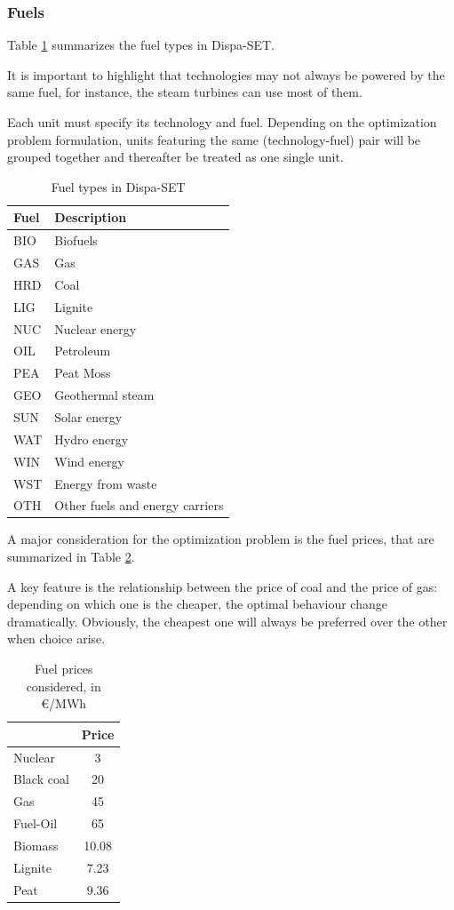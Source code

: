 \subsubsection{Fuels}

Table \ref{table:fuels-eu} summarizes the fuel types in Dispa-SET.

It is important to highlight that technologies may not always be powered by the same fuel, for instance, the steam turbines can use most of them.

Each unit must specify its technology and fuel. Depending on the optimization problem formulation, units featuring the same (technology-fuel) pair will be grouped together and thereafter be treated as one single unit.

\begin{table}[h]
    \centering
	\begin{tabular}{|l l|}
		\hline
		Fuel & Description\\
		\hline
		BIO & Biofuels\\
		GAS & Gas\\
		HRD & Coal\\
		LIG & Lignite \\
		NUC & Nuclear energy\\
		OIL & Petroleum\\
		PEA & Peat Moss\\
		GEO & Geothermal steam \\
		SUN & Solar energy\\
		WAT & Hydro energy\\
		WIN & Wind energy\\
		WST & Energy from waste\\
		OTH & Other fuels and energy carriers\\
		\hline
	\end{tabular}
	\caption{Fuel types in Dispa-SET}
	\label{table:fuels-eu}
\end{table}

A major consideration for the optimization problem is the fuel prices, that are summarized in Table \ref{table:fuel-prices}.

A key feature is the relationship between the price of coal and the price of gas: depending on which one is the cheaper, the optimal behaviour change dramatically. Obviously, the cheapest one will always be preferred over the other when choice arise. 

\begin{table}[h]
    \centering
	\begin{tabular}{|l c|}
		\hline
		& Price \\
		\hline
		Nuclear    & 3 \\
		Black coal & 20 \\
		Gas        & 45 \\
		Fuel-Oil   & 65\\
		Biomass    & 10.08\\
		Lignite    & 7.23\\
		Peat       & 9.36 \\
		\hline
	\end{tabular}
	\caption{Fuel prices considered, in €/MWh}
	\label{table:fuel-prices}
\end{table}

